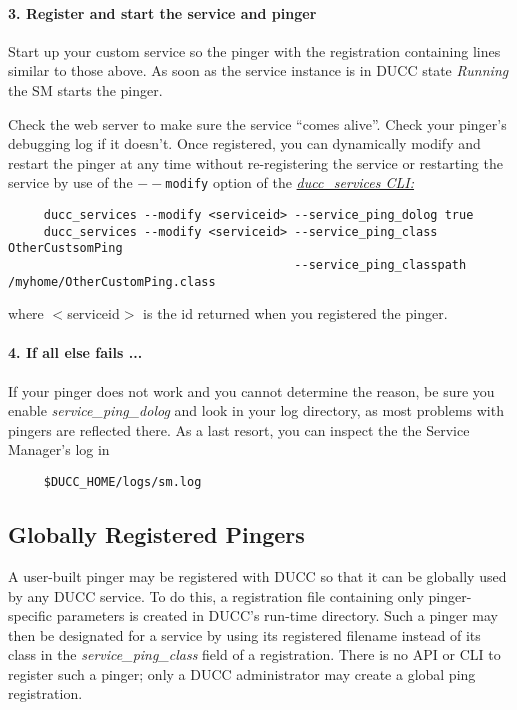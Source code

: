       \paragraph{3. Register and start the service and pinger} Start up your custom service so the pinger with
           the registration containing lines similar to those above.  As soon as the service instance is in
           DUCC state {\em Running} the SM starts the pinger.


           Check the web server to make sure the service ``comes alive''.  Check your pinger's
           debugging log if it doesn't.  Once registered, you can dynamically modify and restart the pinger at any time without
           re-registering the service or restarting the service by use of the {\tt $--$modify} option of the
           \hyperref[sec:cli.ducc-services]{\em ducc\_services CLI:}
\begin{verbatim}
     ducc_services --modify <serviceid> --service_ping_dolog true
     ducc_services --modify <serviceid> --service_ping_class OtherCustsomPing
                                        --service_ping_classpath /myhome/OtherCustomPing.class

\end{verbatim}
     where $<$serviceid$>$ is the id returned when you registered the pinger.

     \paragraph{4. If all else fails ...}
     If your pinger does not work and you cannot determine the reason, be sure you enable {\em service\_ping\_dolog} and
     look in your log directory, as most problems with pingers are reflected there.  As a last resort, you can
     inspect the the Service Manager's log in
\begin{verbatim}
     $DUCC_HOME/logs/sm.log
\end{verbatim}
     
    \subsection{Globally Registered Pingers}
    \label{subsec:services.pingers}

    A user-built pinger may be registered with DUCC so that it can be globally used by any DUCC service.  To do 
    this, a registration file containing only pinger-specific parameters is created in DUCC's run-time
    directory.   Such a pinger may then be designated for a service by using its registered filename
    instead of its class in the {\em service\_ping\_class} field of a registration.  There is no API or
    CLI to register such a pinger; only a DUCC administrator may create a global ping registration.

